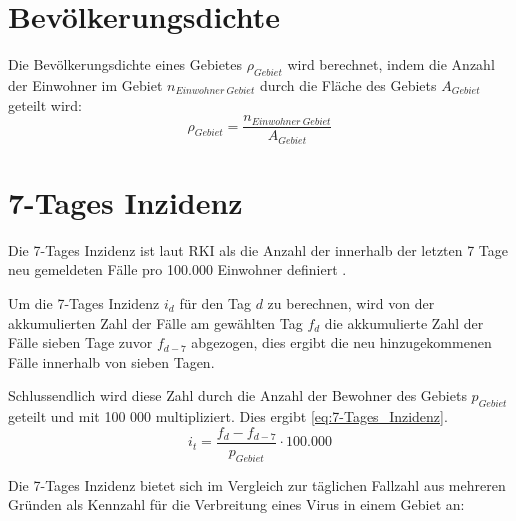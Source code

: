 \section{Bevölkerungsdichte}
Die Bevölkerungsdichte eines Gebietes $\rho_{Gebiet}$ wird berechnet, indem die Anzahl der Einwohner im Gebiet $n_{Einwohner\ Gebiet}$ durch die Fläche des Gebiets $A_{Gebiet}$ geteilt wird:
\begin{equation}\label{eq:Bevölkerungsdichte}
    \rho_{Gebiet} = \frac{n_{Einwohner\  Gebiet}}{A_{Gebiet}}
\end{equation}
\section{7-Tages Inzidenz}\label{sec:Grundlagen:7-Tages Inzidenz}
Die 7-Tages Inzidenz ist laut RKI als die \glqq{}Anzahl der innerhalb der letzten 7 Tage neu gemeldeten Fälle pro 100.000 Einwohner\grqq{} definiert \autocite{7-TageInzidenz}.

Um die 7-Tages Inzidenz $i_d$ für den Tag $d$ zu berechnen, wird von der akkumulierten Zahl der Fälle  am gewählten Tag $f_d$ die akkumulierte Zahl der Fälle sieben Tage zuvor $f_{d-7}$ abgezogen, dies ergibt die neu hinzugekommenen Fälle innerhalb von sieben Tagen.

Schlussendlich wird diese Zahl durch die Anzahl der Bewohner des Gebiets $p_{Gebiet}$ geteilt und mit 100 000 multipliziert. Dies ergibt \autoref{eq:7-Tages_Inzidenz}.
\begin{equation}\label{eq:7-Tages_Inzidenz}
    i_t= \frac{f_d-f_{d-7}}{p_{Gebiet}}\cdot 100.000
\end{equation}

Die 7-Tages Inzidenz bietet sich im Vergleich zur täglichen Fallzahl aus mehreren Gründen als Kennzahl für die Verbreitung eines Virus in einem Gebiet an:


